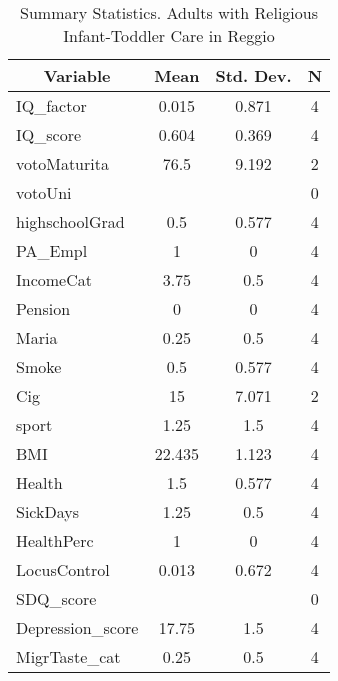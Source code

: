 
\begin{table}[htbp]\centering \caption{Summary Statistics. Adults with Religious Infant-Toddler Care in Reggio \label{bothAdultasiloReliReggio}}
\begin{tabular}{l c c  c}\hline\hline
\multicolumn{1}{c}{\textbf{Variable}} & \textbf{Mean}
 & \textbf{Std. Dev.} & \textbf{N}\\ \hline
IQ\_factor & 0.015 & 0.871  & 4\\
IQ\_score & 0.604 & 0.369  & 4\\
votoMaturita & 76.5 & 9.192  & 2\\
votoUni &  &   & 0\\
highschoolGrad & 0.5 & 0.577  & 4\\
PA\_Empl & 1 & 0  & 4\\
IncomeCat & 3.75 & 0.5  & 4\\
Pension & 0 & 0  & 4\\
Maria & 0.25 & 0.5  & 4\\
Smoke & 0.5 & 0.577  & 4\\
Cig & 15 & 7.071  & 2\\
sport & 1.25 & 1.5  & 4\\
BMI & 22.435 & 1.123  & 4\\
Health & 1.5 & 0.577  & 4\\
SickDays & 1.25 & 0.5  & 4\\
HealthPerc & 1 & 0  & 4\\
LocusControl & 0.013 & 0.672  & 4\\
SDQ\_score &  &   & 0\\
Depression\_score & 17.75 & 1.5  & 4\\
MigrTaste\_cat & 0.25 & 0.5  & 4\\
\hline\end{tabular}
\end{table}
